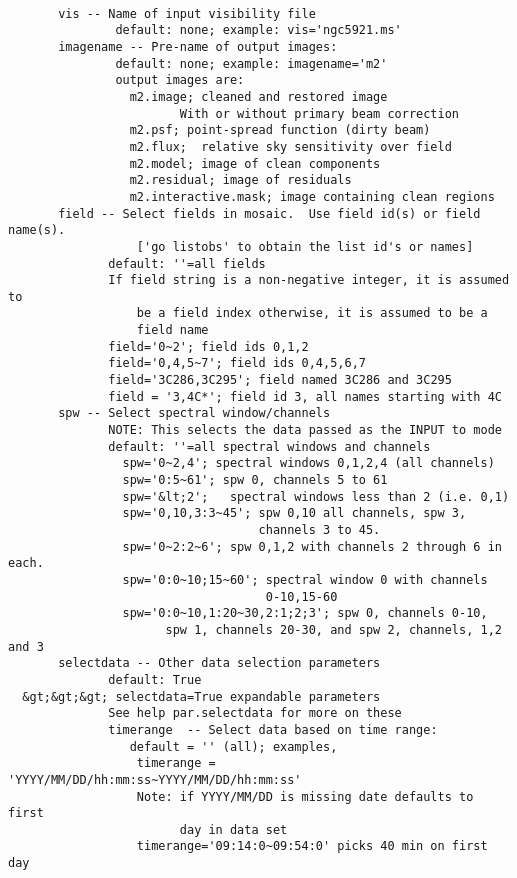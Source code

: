 \begin{verbatim}
 
       vis -- Name of input visibility file
               default: none; example: vis='ngc5921.ms'
       imagename -- Pre-name of output images:
               default: none; example: imagename='m2'
               output images are:
                 m2.image; cleaned and restored image
                        With or without primary beam correction
                 m2.psf; point-spread function (dirty beam)
                 m2.flux;  relative sky sensitivity over field
                 m2.model; image of clean components
                 m2.residual; image of residuals
                 m2.interactive.mask; image containing clean regions
       field -- Select fields in mosaic.  Use field id(s) or field name(s).
                  ['go listobs' to obtain the list id's or names]
              default: ''=all fields
              If field string is a non-negative integer, it is assumed to
                  be a field index otherwise, it is assumed to be a 
                  field name
              field='0~2'; field ids 0,1,2
              field='0,4,5~7'; field ids 0,4,5,6,7
              field='3C286,3C295'; field named 3C286 and 3C295
              field = '3,4C*'; field id 3, all names starting with 4C
       spw -- Select spectral window/channels
              NOTE: This selects the data passed as the INPUT to mode
              default: ''=all spectral windows and channels
                spw='0~2,4'; spectral windows 0,1,2,4 (all channels)
                spw='0:5~61'; spw 0, channels 5 to 61
                spw='&lt;2';   spectral windows less than 2 (i.e. 0,1)
                spw='0,10,3:3~45'; spw 0,10 all channels, spw 3, 
                                   channels 3 to 45.
                spw='0~2:2~6'; spw 0,1,2 with channels 2 through 6 in each.
                spw='0:0~10;15~60'; spectral window 0 with channels 
                                    0-10,15-60
                spw='0:0~10,1:20~30,2:1;2;3'; spw 0, channels 0-10,
                      spw 1, channels 20-30, and spw 2, channels, 1,2 and 3
       selectdata -- Other data selection parameters
              default: True
  &gt;&gt;&gt; selectdata=True expandable parameters
              See help par.selectdata for more on these
              timerange  -- Select data based on time range:
                 default = '' (all); examples,
                  timerange = 'YYYY/MM/DD/hh:mm:ss~YYYY/MM/DD/hh:mm:ss'
                  Note: if YYYY/MM/DD is missing date defaults to first 
                        day in data set
                  timerange='09:14:0~09:54:0' picks 40 min on first day

\end{verbatim}
